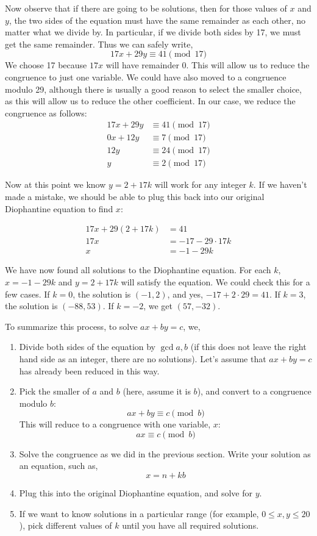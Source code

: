 \documentclass[12pt]{article}
\begin{document}
Now observe that if there are going to be solutions, then for those values of $x$ and $y$, the two sides of the equation must have the same remainder as each other, no matter what we divide by.  In particular, if we divide both sides by 17, we must get the same remainder. Thus we can safely write,
\[17x + 29y \equiv 41 \pmod{17}\]
We choose 17 because $17x$ will have remainder 0.  This will allow us to reduce the congruence to just one variable.  We could have also moved to a congruence modulo 29, although there is usually a good reason to select the smaller choice, as this will allow us to reduce the other coefficient.  In our case, we reduce the congruence as follows:
\[ \begin{aligned}
17x + 29y & \equiv 41 \pmod{17} \\
0x + 12y & \equiv 7 \pmod{17} \\
12 y & \equiv 24 \pmod{17} \\
y & \equiv 2 \pmod{17}
\end{aligned}\]

Now at this point we know $y = 2 + 17k$ will work for any integer $k$.  If we haven't made a mistake, we should be able to plug this back into our original Diophantine equation to find $x$:

\[\begin{aligned}
17x + 29(2 + 17k) & = 41\\
17x & = -17 - 29\cdot 17k\\
x & = -1-29k
\end{aligned}\]

We have now found all solutions to the Diophantine equation.  For each $k$, $x = -1-29k$ and $y = 2 + 17k$ will satisfy the equation.  We could check this for a few cases.  If $k = 0$, the solution is $(-1,2)$, and yes, $-17 + 2\cdot 29 = 41$.  If $k = 3$, the solution is $(-88, 53)$.  If $k = -2$, we get $(57, -32)$.

To summarize this process, to solve $ax + by = c$, we,
\begin{enumerate}
	\item Divide both sides of the equation by $\gcd{a,b}$ (if this does not leave the right hand side as an integer, there are no solutions).  Let's assume that $ax + by = c$ has already been reduced in this way.
	\item Pick the smaller of $a$ and $b$ (here, assume it is $b$), and convert to a congruence modulo $b$:
	\[ax + by \equiv c \pmod{b}\]
	This will reduce to a congruence with one variable, $x$:
	\[ax \equiv c \pmod{b}\]
	\item Solve the congruence as we did in the previous section.  Write your solution as an equation, such as,
	\[x = n + kb\]
	\item Plug this into the original Diophantine equation, and solve for $y$.
	\item If we want to know solutions in a particular range (for example, $0 \le x, y \le 20$), pick different values of $k$ until you have all required solutions.
\end{enumerate}
\end{document}
